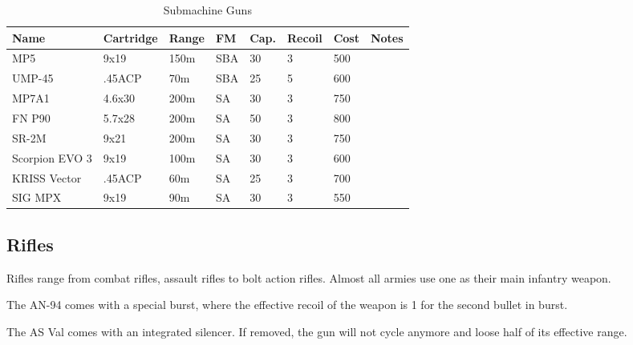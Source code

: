 \begin{table}
  \caption{Submachine Guns}
  \begin{center}
    \begin{tabular}{| l | l | l | l | l | l | l | l |}
      \hline
      \textbf{Name} & \textbf{Cartridge} & \textbf{Range} &
      \textbf{FM} & \textbf{Cap.} & \textbf{Recoil} &
      \textbf{Cost} & \textbf{Notes} \\ \hline

      MP5            & 9x19   & 150m & SBA & 30 & 3 & 500 & \\ \hline
      UMP-45         & .45ACP &  70m & SBA & 25 & 5 & 600 & \\ \hline
      MP7A1          & 4.6x30 & 200m & SA  & 30 & 3 & 750 & \\ \hline
      FN P90         & 5.7x28 & 200m & SA  & 50 & 3 & 800 & \\ \hline
      SR-2M          & 9x21   & 200m & SA  & 30 & 3 & 750 & \\ \hline
      Scorpion EVO 3 & 9x19   & 100m & SA  & 30 & 3 & 600 & \\ \hline
      KRISS Vector   & .45ACP &  60m & SA  & 25 & 3 & 700 & \\ \hline
      SIG MPX        & 9x19   &  90m & SA  & 30 & 3 & 550 & \\ \hline

    \end{tabular}
  \end{center}
\end{table}

\subsection{Rifles}

Rifles range from combat rifles, assault rifles to bolt action rifles. Almost
all armies use one as their main infantry weapon.

The AN-94 comes with a special burst, where the effective recoil of the weapon
is 1 for the second bullet in burst.

The AS Val comes with an integrated silencer. If removed, the gun will not
cycle anymore and loose half of its effective range.

